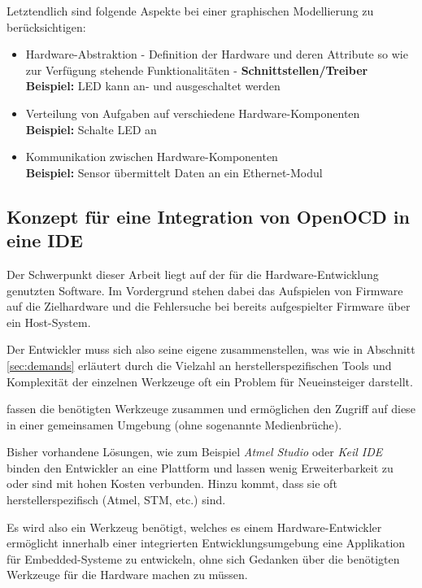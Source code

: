     Letztendlich sind folgende Aspekte bei einer graphischen Modellierung zu berücksichtigen:
    \begin{itemize}
        \item Hardware-Abstraktion - Definition der Hardware und deren Attribute so wie zur Verfügung stehende
        Funktionalitäten - \textbf{Schnittstellen/Treiber}\\
        \textbf{Beispiel:} LED kann an- und ausgeschaltet werden
        \item Verteilung von Aufgaben auf verschiedene Hardware-Komponenten\\
        \textbf{Beispiel:} Schalte LED an
        \item Kommunikation zwischen Hardware-Komponenten\\
        \textbf{Beispiel:} Sensor übermittelt Daten an ein Ethernet-Modul
    \end{itemize}

    \subsection{Konzept für eine Integration von OpenOCD in eine IDE}
    Der Schwerpunkt dieser Arbeit liegt auf der für die Hardware-Entwicklung genutzten Software. Im Vordergrund stehen
    dabei das Aufspielen von Firmware auf die Zielhardware und die Fehlersuche bei bereits aufgespielter Firmware über
    ein Host\hyp{}System.

    Der Entwickler muss sich also seine eigene  zusammenstellen, was wie in Abschnitt
    \ref{sec:demands} erläutert durch die Vielzahl an herstellerspezifischen Tools und Komplexität der einzelnen
    Werkzeuge oft ein Problem für Neueinsteiger darstellt.

     fassen die benötigten Werkzeuge zusammen und ermöglichen den Zugriff auf
    diese in einer gemeinsamen Umgebung (ohne sogenannte Medienbrüche).

    Bisher vorhandene Lösungen, wie zum Beispiel \textit{Atmel Studio} oder \textit{Keil IDE} binden den Entwickler an
    eine Plattform und lassen wenig Erweiterbarkeit zu oder sind mit hohen Kosten verbunden. Hinzu kommt, dass sie oft
    herstellerspezifisch (Atmel, STM, etc.) sind.

    Es wird also ein Werkzeug benötigt, welches es einem Hardware-Entwickler ermöglicht innerhalb einer integrierten
    Entwicklungsumgebung eine Applikation für Embedded-Systeme zu entwickeln, ohne sich Gedanken über die benötigten
    Werkzeuge für die Hardware machen zu müssen.

